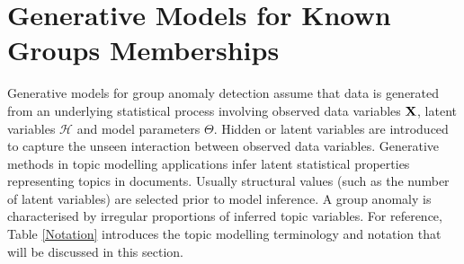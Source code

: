 \section{Generative Models for Known Groups Memberships} \label{Sec:G}
Generative models for group anomaly detection   assume that data is generated from an underlying statistical process involving observed data variables $\bf X$,  latent variables $\mathcal{H}$ and model parameters $\Theta$.   Hidden or latent variables are introduced to capture the unseen interaction between observed  data variables. Generative methods in topic modelling applications infer  latent statistical properties representing topics in documents.  Usually structural values (such as the number of latent variables) are selected prior to model inference. %
A group anomaly is characterised by irregular proportions of inferred topic variables. %
For reference, Table \ref{Notation} introduces the topic modelling  terminology and notation that will be discussed  in this section. %


